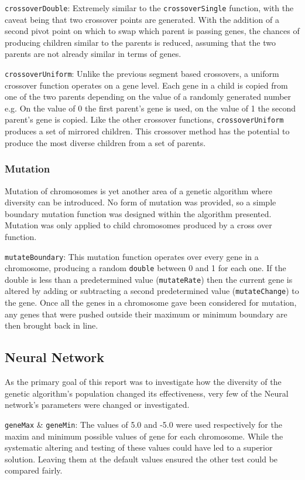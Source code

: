 			\texttt{crossoverDouble}: Extremely similar to the  \texttt{crossoverSingle} function, with the caveat being that two crossover points are generated. With the addition of a second pivot point on which to swap which parent is passing genes, the chances of producing children similar to the parents is reduced, assuming that the two parents are not already similar in terms of genes.
			
			\texttt{crossoverUniform}: Unlike the previous segment based crossovers, a uniform crossover function operates on a gene level. Each gene in a child is copied from one of the two parents depending on the value of a randomly generated number e.g. On the value of 0 the first parent's gene is used, on the value of 1 the second parent's gene is copied. Like the other crossover functions, \texttt{crossoverUniform} produces a set of mirrored children. This crossover method has the potential to produce the most diverse children from a set of parents. 
			
		\subsubsection{Mutation}
			Mutation of chromosomes is yet another area of a genetic algorithm where diversity can be introduced. No form of mutation was provided, so a simple boundary mutation function was designed within the algorithm presented. Mutation was only applied to child chromosomes produced by a cross over function.
			
			\texttt{mutateBoundary}: This mutation function operates over every gene in a chromosome, producing a random \texttt{double} between 0 and 1 for each one. If the double is less than a predetermined value (\texttt{mutateRate}) then the current gene is altered by adding  or subtracting a second predetermined value (\texttt{mutateChange}) to the gene. Once all the genes in a chromosome gave been considered for mutation, any genes that were pushed outside their maximum or minimum boundary are then brought back in line.
		
	\subsection{Neural Network}
		As the primary goal of this report was to investigate how the diversity of the genetic algorithm's population changed its effectiveness, very few of the Neural network's parameters were changed or investigated.
		
		\texttt{geneMax} \& \texttt{geneMin}: The values of 5.0 and -5.0 were used respectively for the maxim and minimum possible values of gene for each chromosome. While the systematic altering and testing of these values could have led to a superior solution. Leaving them at the default values ensured the other test could be compared fairly.
		
